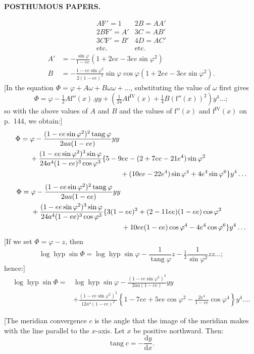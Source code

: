 \par\clearpage
{}\hfill{\small\textbf{POSTHUMOUS PAPERS.}}\hfill\null\par\medskip
{}
\[
\begin{array}{cc}
A\mathrm F'=1&2B=AA'\\2B\mathrm F'=A'&3C=AB'\\3C\mathrm F'=B'&4D=AC'\\\text{etc.}&\text{etc.}
\end{array}
\]
\[
\begin{aligned}
A'&=-\frac{\sin\varphi}{1-ee}(1+2ee-3ee\sin\varphi^2)\\
B&=-\frac{1-ee\sin\varphi^2}{2(1-ee)^2}\sin\varphi\cos\varphi(1+2ee-3ee\sin\varphi^2).
\end{aligned}
\]
[In the equation \(\Phi=\varphi+A\omega+B\omega\omega+\ldots\), substituting the value of \(\omega\) first gives
\[\Phi=\varphi-\tfrac12A\mathrm f''(x).yy+\left(\tfrac1{24}A\mathrm f^{\mathrm{IV}}(x)+\tfrac14B(\mathrm f''(x))^2\right)y^4\ldots;\]
\noindent so with the above values of \(A\) and \(B\) and the values of \(\mathrm f''(x)\) and \(\mathrm f^{\mathrm{IV}}(x)\) on p.~144, we obtain:]
\[
\begin{aligned}
\Phi={}&\varphi-\frac{(1-ee\sin\varphi^2)^2\operatorname{tang}\varphi}{2aa(1-ee)}yy\\
&+\frac{(1-ee\sin\varphi^2)^3\sin\varphi}{24a^4(1-ee)^3\cos\varphi^3}\{5-9ee-(2+7ee-21e^4)\sin\varphi^2\\
&\hspace{45mm}+(10ee-22e^4)\sin\varphi^4+4e^4\sin\varphi^6\}y^4\ldots
\end{aligned}
\]
\noindent[or]
\[
\begin{aligned}
\Phi={}&\varphi-\frac{(1-ee\sin\varphi^2)^2\operatorname{tang}\varphi}{2aa(1-ee)}yy\\
&+\frac{(1-ee\sin\varphi^2)^3\sin\varphi}{24a^4(1-ee)^3\cos\varphi^3}\{3(1-ee)^2+(2-11ee)(1-ee)\cos\varphi^2\\
&\hspace{45mm}+10ee(1-ee)\cos\varphi^4-4e^4\cos\varphi^6\}y^4\ldots
\end{aligned}
\]
[If we set \(\Phi=\varphi-z\), then
\[\log\operatorname{hyp}\sin\Phi=\log\operatorname{hyp}\sin\varphi-\frac1{\operatorname{tang}\varphi}z-\tfrac12\frac1{\sin\varphi^2}zz\ldots;\]
\noindent hence:]
\[
\begin{aligned}
\log\operatorname{hyp}\sin\Phi={}&\log\operatorname{hyp}\sin\varphi-\frac{(1-ee\sin\varphi^2)^2}{2aa(1-ee)}yy\\
&+\frac{(1-ee\sin\varphi^2)^3}{12a^4(1-ee)^2}\left\{1-7ee+5ee\cos\varphi^2-\frac{2e^4}{1-ee}\cos\varphi^4\right\}y^4\ldots.
\end{aligned}
\]
{\centering [2.]\par
[Calculation of meridian convergence from plane rectangular coordinates.]\par}
[The meridian convergence \(c\) is the angle that the image of the meridian makes with the line parallel to the \(x\)-axis. Let \(x\) be positive northward. Then:
\[\operatorname{tang}c=-\frac{\mathrm dy}{\mathrm dx}.\]

